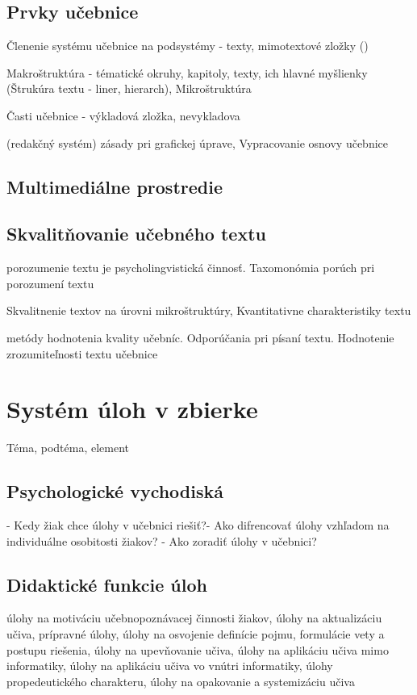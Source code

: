 \subsection{Prvky učebnice}
Členenie systému učebnice na podsystémy - texty, mimotextové zložky (\cite{zujev_ako_1986})

Makroštruktúra \cite{pavlovkin_ziak_1989} - tématické okruhy, kapitoly, texty, ich hlavné myšlienky (Štrukúra textu - liner, hierarch), Mikroštruktúra

Časti učebnice - výkladová zložka, nevykladova \cite{gavora_ziak_1992}

(redakčný systém) zásady pri grafickej úprave, Vypracovanie osnovy učebnice \cite{mlady_tvorba_1988}

\subsection{Multimediálne prostredie}
\cite{krotky_nove_2015}

\subsection{Skvalitňovanie učebného textu}
porozumenie textu je psycholingvistická činnosť. Taxomonómia porúch pri porozumení textu \cite{gavora_ziak_1992}

Skvalitnenie textov na úrovni mikroštruktúry, Kvantitativne charakteristiky textu \cite{pavlovkin_ziak_1989}

metódy hodnotenia kvality učebníc. Odporúčania pri písaní textu. Hodnotenie zrozumiteľnosti textu učebnice \cite{drahosova_hodnotenie_2014}


\section{Systém úloh v zbierke}
Téma, podtéma, element \cite{mindakova_tvorba_2008}

\subsection{Psychologické vychodiská}
 - Kedy žiak chce úlohy v učebnici riešiť?- Ako difrencovať úlohy vzhľadom na individuálne osobitosti žiakov? - Ako zoradiť úlohy v učebnici?\cite{pavlovkin_ziak_1989}

\subsection{Didaktické funkcie úloh}
úlohy na motiváciu učebnopoznávacej činnosti žiakov, úlohy na aktualizáciu učiva, prípravné úlohy, úlohy na osvojenie definície pojmu, formulácie vety a postupu riešenia, úlohy na upevňovanie učiva, úlohy na aplikáciu učiva mimo informatiky, úlohy na aplikáciu učiva vo vnútri informatiky, úlohy propedeutického charakteru, úlohy na opakovanie a systemizáciu učiva \cite{mindakova_tvorba_2008}

